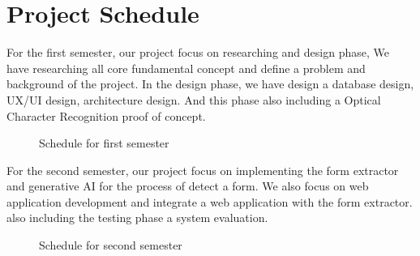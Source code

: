 \documentclass[12pt,oneside,openright,a4paper]{cpe-english-project}
\begin{document}
\section{Project Schedule}
For the first semester, our project focus on researching and design phase, We have researching all core fundamental concept and define a problem and background of the project. In the design phase, we have design a database design, UX/UI design, architecture design. And this phase also including a Optical Character Recognition proof of concept.

\begin{figure}[H]
\centering
{}
\caption{Schedule for first semester}\label{fig:figure-1.1}
\end{figure}

For the second semester, our project focus on implementing the form extractor and generative AI for the process of detect a form. We also focus on web application development and integrate a web application with the form extractor. also including the testing phase a system evaluation.

\begin{figure}[H]
\centering
{}
\caption{Schedule for second semester}\label{fig:figure-1.2}
\end{figure}
\end{document}
